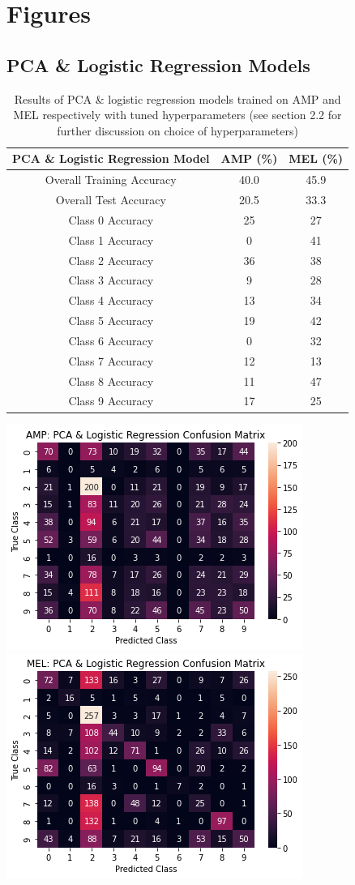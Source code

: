 \documentclass[11pt]{article}
\begin{document}
\newpage

\section{Figures}
\subsection{PCA \& Logistic Regression Models}
\begin{table}[H]
\centering
\caption{Results of PCA \& logistic regression models trained on AMP and MEL respectively with tuned hyperparameters (see section 2.2 for further discussion on choice of hyperparameters)}
\begin{tabular}{|c|c|c|}
 \toprule
 PCA \& Logistic Regression Model & AMP (\%) & MEL (\%)\\
 \midrule
 Overall Training Accuracy & 40.0 & 45.9\\
 Overall Test Accuracy & 20.5 & 33.3\\
 Class 0 Accuracy & 25 & 27\\
 Class 1 Accuracy & 0 & 41\\
 Class 2 Accuracy & 36 & 38 \\
 Class 3 Accuracy & 9 & 28\\
 Class 4 Accuracy & 13 & 34\\
 Class 5 Accuracy & 19 & 42\\
 Class 6 Accuracy & 0 & 32\\
 Class 7 Accuracy & 12 & 13\\
 Class 8 Accuracy & 11 & 47\\
 Class 9 Accuracy & 17 & 25\\
 \bottomrule
\end{tabular}
\end{table}
\begin{center}
    \includegraphics[width=0.45\linewidth]{cfm_lr_pca_amp.png}
    \includegraphics[width=0.45\linewidth]{cfm_lr_pca_mel.png}
\end{center}
\end{document}
